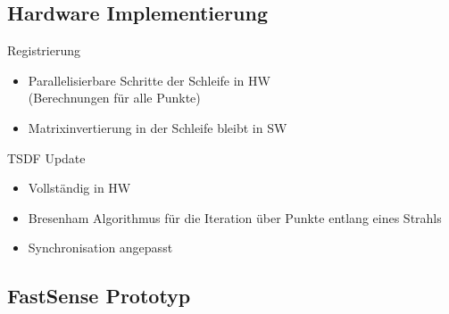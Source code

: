 \documentclass{beamer}
\begin{document}
\subsection{Hardware Implementierung}
\begin{frame}{\subsecname}
\begin{center}
\begin{LARGE}
Registrierung
\end{LARGE}
\end{center}
\begin{itemize}
\item{Parallelisierbare Schritte der Schleife in HW\\(Berechnungen für alle Punkte)}
\item{Matrixinvertierung in der Schleife bleibt in SW}
\end{itemize}
\vspace{1cm}
\begin{center}
\begin{LARGE}
TSDF Update
\end{LARGE}
\end{center}
\begin{itemize}
\item{Vollständig in HW}
\item{Bresenham Algorithmus für die Iteration über Punkte entlang eines Strahls}
\item{Synchronisation angepasst}
\end{itemize}
\end{frame}

\subsection{FastSense Prototyp}
\begin{frame}{\subsecname}
\begin{center}
\end{center}
\end{frame}
\end{document}
